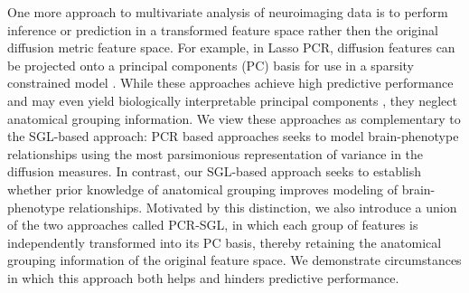 \documentclass[10pt,letterpaper]{article}
\begin{document}
One more approach to multivariate analysis of neuroimaging data is to perform inference or prediction in a transformed feature space rather then the original diffusion metric feature space. For example, in Lasso PCR, diffusion features can be projected onto a principal components (PC) basis for use in a sparsity constrained model \cite{powell2018local, rasero2021integrating}. While these approaches achieve high predictive performance and may even yield biologically interpretable principal components \cite{chamberland2019dimensionality}, they neglect anatomical grouping information. We view these approaches as complementary to the SGL-based approach: PCR based approaches seeks to model brain-phenotype relationships using the most parsimonious representation of variance in the diffusion measures. In contrast, our SGL-based approach seeks to establish whether prior knowledge of anatomical grouping improves modeling of brain-phenotype relationships. Motivated by this distinction, we also introduce a union of the two approaches called PCR-SGL, in which each group of features is independently transformed into its PC basis, thereby retaining the anatomical grouping information of the original feature space. We demonstrate circumstances in which this approach both helps and hinders predictive performance.
\end{document}

